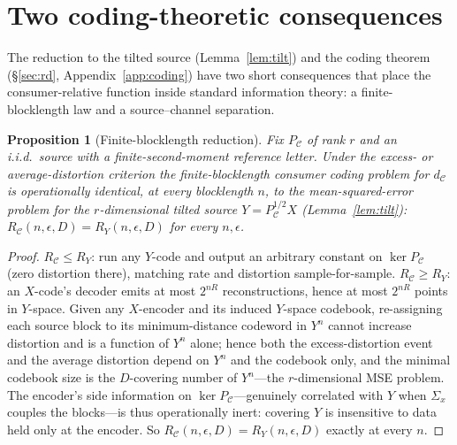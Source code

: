 \documentclass[11pt]{article}
\newtheorem{proposition}{Proposition}
\theoremstyle{definition}
\theoremstyle{remark}
\newcommand{\PC}{P_{\mathcal{C}}}
\begin{document}
\section{Two coding-theoretic consequences}\label{sec:consequences}

The reduction to the tilted source (Lemma~\ref{lem:tilt}) and the coding theorem
(\S\ref{sec:rd}, Appendix~\ref{app:coding}) have two short consequences that place the
consumer-relative function inside standard information theory: a finite-blocklength law
and a source--channel separation.

\begin{proposition}[Finite-blocklength reduction]\label{prop:dispersion}
Fix $\PC$ of rank $r$ and an i.i.d.\ source with a finite-second-moment reference letter.
Under the excess- or average-distortion criterion the finite-blocklength consumer coding
problem for $d_{\mathcal C}$ is operationally identical, \emph{at every blocklength $n$}, to
the mean-squared-error problem for the $r$-dimensional tilted source $Y=\PC^{1/2}X$
(Lemma~\ref{lem:tilt}): $R_{\mathcal C}(n,\epsilon,D)=R_Y(n,\epsilon,D)$ for every
$n,\epsilon$.
\end{proposition}
\begin{proof}
$R_{\mathcal C}\le R_Y$: run any $Y$-code and output an arbitrary constant on $\ker\PC$
(zero distortion there), matching rate and distortion sample-for-sample. $R_{\mathcal
C}\ge R_Y$: an $X$-code's decoder emits at most $2^{nR}$ reconstructions, hence at most
$2^{nR}$ points in $Y$-space. Given any $X$-encoder and its induced $Y$-space codebook,
re-assigning each source block to its minimum-distance codeword in $Y^n$ cannot increase
distortion and is a function of $Y^n$ alone; hence both the excess-distortion event and the
average distortion depend on $Y^n$ and the codebook only, and the minimal codebook size is
the $D$-covering number of $Y^n$---the $r$-dimensional MSE problem. The encoder's side
information on $\ker\PC$---genuinely correlated with $Y$ when $\Sigma_x$ couples the
blocks---is thus operationally inert: covering $Y$ is insensitive to data held only at the
encoder. So $R_{\mathcal C}(n,\epsilon,D)=R_Y(n,\epsilon,D)$ exactly at every $n$.
\end{proof}
\end{document}
